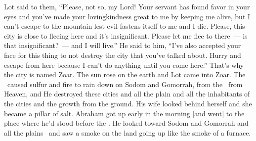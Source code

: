 \begin{inparaenum}
   Lot said to them, ``Please, not so, my Lord!%
   Your servant has found favor in your eyes and you've made your lovingkindness great to me by keeping me alive, but I can't escape to the mountain lest evil fastens itself to me and I die.%
   Please, this city is close to fleeing here and it's insignificant. Please let me flee to there~--- is that insignificant?~--- and I will live.''%
   He said to him, ``I've also accepted your face for this thing to not destroy the city that you've talked about.%
   Hurry and escape from here because I can't do anything until you come here.'' That's why the city is named Zoar.%
   The sun rose on the earth and Lot came into Zoar.%
   The \lord\ caused sulfur and fire to rain down on Sodom and Gomorrah, from the \lord\ from Heaven,%
   and He destroyed these cities and all the plain and all the inhabitants of the cities and the growth from the ground.%
   His wife looked behind herself and she became a pillar of salt.%
   Abraham got up early in the morning [and went] to the place where he'd stood before the \lord.%
   He looked toward Sodom and Gomorrah and all the plains\
  and saw a smoke on the land going up like the smoke of a furnace.\alt{forge.}%


\end{inparaenum}

